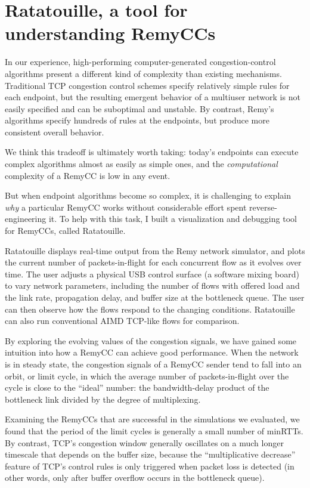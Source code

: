 \section{Ratatouille, a tool for understanding RemyCCs}

In our experience, high-performing computer-generated
congestion-control algorithms present a different kind of complexity
than existing mechanisms. Traditional TCP congestion control schemes
specify relatively simple rules for each endpoint, but the resulting
emergent behavior of a multiuser network is not easily specified and
can be suboptimal and unstable. By contrast, Remy's algorithms specify
hundreds of rules at the endpoints, but produce more consistent
overall behavior.

We think this tradeoff is ultimately worth taking: today's endpoints
can execute complex algorithms almost as easily as simple ones, and
the \textit{computational} complexity of a RemyCC is low in any event.

But when endpoint algorithms become so complex, it is challenging to
explain \emph{why} a particular RemyCC works without considerable
effort spent reverse-engineering it. To help with this task, I built a
visualization and debugging tool for RemyCCs, called Ratatouille.

Ratatouille displays real-time output from the Remy network simulator,
and plots the current number of packets-in-flight for each concurrent
flow as it evolves over time. The user adjusts a physical USB control
surface (a software mixing board) to vary network parameters,
including the number of flows with offered load and the link rate,
propagation delay, and buffer size at the bottleneck queue. The user
can then observe how the flows respond to the changing
conditions. Ratatouille can also run conventional AIMD TCP-like flows
for comparison.

By exploring the evolving values of the congestion signals, we have
gained some intuition into how a RemyCC can achieve good
performance. When the network is in steady state, the congestion
signals of a RemyCC sender tend to fall into an orbit, or limit cycle,
in which the average number of packets-in-flight over the cycle is
close to the ``ideal'' number: the bandwidth-delay product of the
bottleneck link divided by the degree of multiplexing.

Examining the RemyCCs that are successful in the simulations we
evaluated, we found that the period of the limit cycles is generally a
small number of minRTTs. By contrast, TCP's congestion window
generally oscillates on a much longer timescale that depends on the
buffer size, because the ``multiplicative decrease'' feature of TCP's
control rules is only triggered when packet loss is detected (in other
words, only after buffer overflow occurs in the bottleneck queue).

